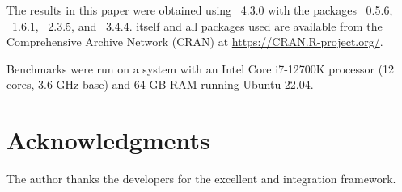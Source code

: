\documentclass[article]{jss_modified}
\begin{document}
The results in this paper were obtained using ~4.3.0 with the 
packages ~0.5.6, ~1.6.1, ~2.3.5, and 
~3.4.4.  itself and all packages used are available 
from the Comprehensive  Archive Network (CRAN) at 
\url{https://CRAN.R-project.org/}.

Benchmarks were run on a system with an Intel Core i7-12700K processor (12 
cores, 3.6 GHz base) and 64 GB RAM running Ubuntu 22.04.



\section*{Acknowledgments}

The author thanks the  developers for the excellent  and 
 integration framework.







\newpage
\end{document}

